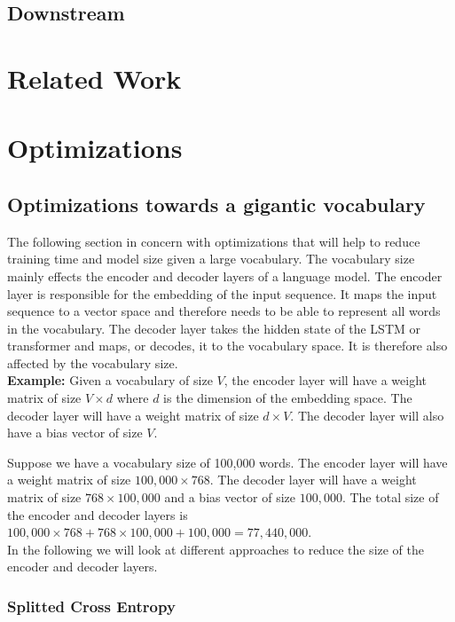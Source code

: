 \documentclass[11pt]{article}
\begin{document}
\subsection{Downstream}

\section{Related Work}



\section{Optimizations}

\subsection{Optimizations towards a gigantic vocabulary}

The following section in concern with optimizations that will help to reduce training time and
model size given a large vocabulary. The vocabulary size mainly effects the encoder and decoder
layers of a language model. The encoder layer is responsible for the embedding of the input
sequence. It maps the input sequence to a vector space and therefore needs to be able to
represent all words in the vocabulary. The decoder layer takes the hidden state of the
LSTM or transformer and maps, or decodes, it to the vocabulary space. It is therefore also affected
by the vocabulary size.\\

\textbf{Example:}
Given a vocabulary of size $V$, the encoder layer will have a weight matrix of size
$V \times d$ where $d$ is the dimension of the embedding space. The decoder layer will have a
weight matrix of size $d \times V$. The decoder layer will also have a bias vector of size $V$.

Suppose we have a vocabulary size of 100,000 words. The encoder layer will have a weight matrix
of size $100,000 \times 768$. The decoder layer will have a weight matrix of size $768 \times 100,000$
and a bias vector of size $100,000$. The total size of the encoder and decoder layers is
$100,000 \times 768 + 768 \times 100,000 + 100,000 = 77,440,000$.\\

In the following we will look at different approaches to reduce the size of the encoder and decoder
layers.

\subsubsection{Splitted Cross Entropy}
\end{document}
